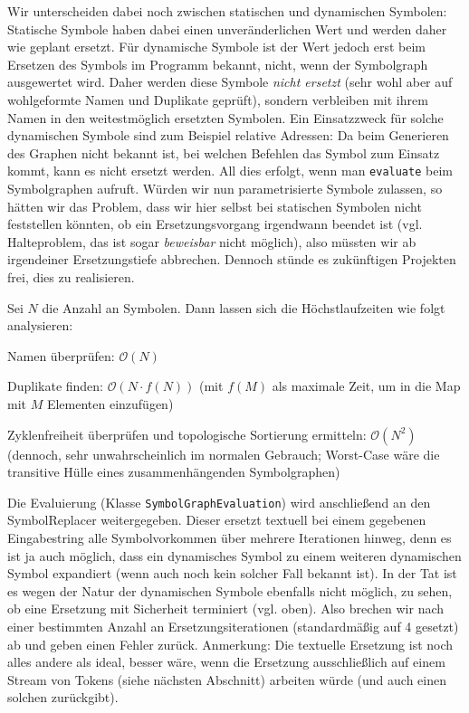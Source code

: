 Wir unterscheiden dabei noch zwischen statischen und dynamischen Symbolen:
Statische Symbole haben dabei einen unveränderlichen Wert und werden daher wie
geplant ersetzt. Für dynamische Symbole ist der Wert jedoch erst beim Ersetzen
des Symbols im Programm bekannt, nicht, wenn der Symbolgraph ausgewertet wird.
Daher werden diese Symbole \emph{nicht ersetzt} (sehr wohl aber auf wohlgeformte
Namen und Duplikate geprüft), sondern verbleiben mit ihrem Namen in den
weitestmöglich ersetzten Symbolen. Ein Einsatzzweck für solche dynamischen
Symbole sind zum Beispiel relative Adressen: Da beim Generieren des Graphen
nicht bekannt ist, bei welchen Befehlen das Symbol zum Einsatz kommt, kann es
nicht ersetzt werden. All dies erfolgt, wenn man \texttt{evaluate} beim
Symbolgraphen aufruft. Würden wir nun parametrisierte Symbole zulassen, so
hätten wir das Problem, dass wir hier selbst bei statischen Symbolen nicht
feststellen könnten, ob ein Ersetzungsvorgang irgendwann beendet ist (vgl.
Halteproblem, das ist sogar \emph{beweisbar} nicht möglich), also müssten wir ab
irgendeiner Ersetzungstiefe abbrechen. Dennoch stünde es zukünftigen Projekten
frei, dies zu realisieren.

\vspace{-0.2cm}
Sei $N$ die Anzahl an Symbolen. Dann lassen sich die Höchstlaufzeiten wie folgt analysieren:
\begin{sitemize}{-0.5cm}
    \item Namen überprüfen: $\mathcal{O}(N)$

    \item Duplikate finden: $\mathcal{O}(N \cdot f(N))$ (mit $f(M)$ als maximale
    Zeit, um in die Map mit $M$ Elementen einzufügen)

    \item Zyklenfreiheit überprüfen und topologische Sortierung ermitteln:
    $\mathcal{O}(N^2)$ (dennoch, sehr unwahrscheinlich im normalen Gebrauch;
    Worst-Case wäre die transitive Hülle eines zusammenhängenden Symbolgraphen)
\end{sitemize}
\vspace{-0.2cm}

\pagebreak
Die Evaluierung (Klasse \texttt{SymbolGraphEvaluation}) wird anschließend an den
SymbolReplacer weitergegeben. Dieser ersetzt textuell bei einem gegebenen
Eingabestring alle Symbolvorkommen über mehrere Iterationen hinweg, denn es ist
ja auch möglich, dass ein dynamisches Symbol zu einem weiteren dynamischen
Symbol expandiert (wenn auch noch kein solcher Fall bekannt ist). In der Tat ist
es wegen der Natur der dynamischen Symbole ebenfalls nicht möglich, zu sehen, ob
eine Ersetzung mit Sicherheit terminiert (vgl. oben). Also brechen wir nach
einer bestimmten Anzahl an Ersetzungsiterationen (standardmäßig auf 4 gesetzt)
ab und geben einen Fehler zurück. Anmerkung: Die textuelle Ersetzung ist noch
alles andere als ideal, besser wäre, wenn die Ersetzung ausschließlich auf einem
Stream von Tokens (siehe nächsten Abschnitt) arbeiten würde (und auch einen
solchen zurückgibt).


